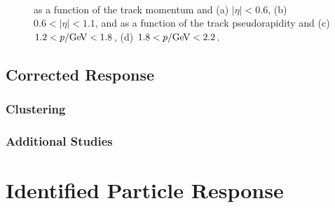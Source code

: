 \begin{figure}[htbp]
{}
~
\caption{\epbg as a function of the track momentum and (a) $|\eta| < 0.6$, (b) $0.6 < |\eta| < 1.1$, and as a function of the track pseudorapidity and (c) $1.2 < p / \GeV < 1.8$, (d) $1.8 < p / \GeV < 2.2$.}
\label{fig:eoverp_background}
\end{figure}

\subsection{Corrected Response}
\label{sec:response}

\subsubsection{Clustering}
\label{sec:clustering}

\subsubsection{Additional Studies}
\label{sec:additional}


\section{Identified Particle Response}
\label{sec:identified}

